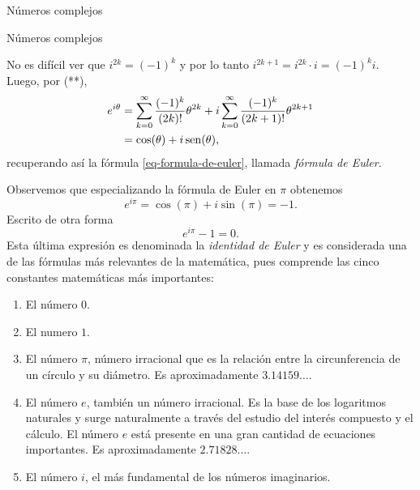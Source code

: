 \begin{chapter}{N\'umeros complejos}
\begin{section}{N\'umeros complejos}
\begin{observacion*}
            No es difícil ver que $i^{2k} = (-1)^k$ y por lo tanto $i^{2k+1} = i^{2k}\cdot i = (-1)^ki $. Luego, por (**), 
            \begin{align*}
                e^{i\theta} &=  \sum_{k=0}^{\infty} \frac{(-1)^k}{(2k)!}\theta^{2k}  + i\sum_{k=0}^{\infty} \frac{ (-1)^k}{(2k+1)!}\theta^{2k+1} \\
                &=\cos(\theta) + i \operatorname{sen}(\theta), 
            \end{align*}
            recuperando así  la fórmula \eqref{eq-formula-de-euler}, llamada \emph{fórmula de Euler.} 
        \end{observacion*}

        \begin{observacion*}  Observemos que especializando la fórmula de Euler en $\pi$ obtenemos 
            \begin{equation*}
                    e^{i\pi} = \cos(\pi) + i\sin(\pi) = -1.
            \end{equation*}
            Escrito de otra forma
            \begin{equation}
                e^{i\pi} -1 =0.
            \end{equation}
            Esta última expresión es denominada la \emph{identidad de Euler} y es considerada una de las fórmulas más relevantes de la matemática, pues comprende las cinco constantes matemáticas más importantes: 
            \begin{enumerate}
                \item El número \boldmath${0}$.
                \item El numero \boldmath${1}$.
                \item El número \boldmath${\pi}$, número irracional  que es la relación entre la circunferencia de un círculo y su diámetro. Es aproximadamente $3.14159\ldots$.
                \item El número \boldmath${e}$, también un número irracional. Es la base de los logaritmos naturales y surge naturalmente a través del estudio del interés compuesto y el cálculo. El número $e$ está presente en una gran cantidad de ecuaciones importantes. Es aproximadamente $2.71828\ldots$.
                \item El número \boldmath$i$, el más fundamental de los números imaginarios.
            \end{enumerate}
        \end{observacion*}
    \end{section}	
    

\end{chapter}
